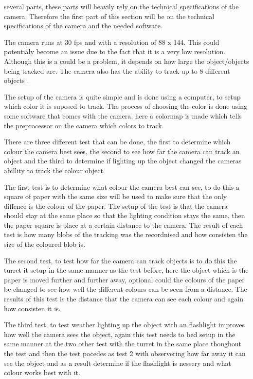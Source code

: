 several parts, these parts will heavily rely
on the technical specifications of the camera. Therefore the first part of this
section will be on the technical specifications of the camera and the needed
software.\nl

The camera runs at 30 fps and with a resolution of 88 x 144. This could
potentialy become an issue due to the fact that it is a very low resolution.
Although this is a could be a problem, it depends on how large the
object/objects being tracked are.
The camera also has the ability to track up to 8 different objects
. \nl

The setup of the camera is quite simple and is done using a computer, to setup
which color it is suposed to track. The process of choosing the color is done
using some software that comes with the camera, here a colormap is made which
tells the preprocessor on the camera which colors to track. 

There are three different test that can be done, the first to 
determine which colour the camera best sees, the second to see how
far the camera can track an object and the third to determine if lighting up the
object changed the cameras abillity to track the colour \/ object.\nl

The first test is to determine what colour the camera best can see, to do this
a square of paper with the same size will be used to make sure that the only
diffence is the colour of the paper. The setup of the test is that the camera
should stay at the same place so that the lighting condition stays the same,
then the paper square is place at a certain distance to the camera. The result
of each test is how many blobs of the tracking was the recordnised and how
consisten the size of the coloured blob is.\nl

The second test, to test how far the camera can track objects is to do this the
turret it setup in the same manner as the test before, here the object which is
the paper is moved further and further away, optional could the colours of the
paper be changed to see how well the different colours can be seen from a
distance. The results of this test is the distance that the camera can see each
colour and again how consisten it is.\nl

The third test, to test weather lighting up the object with an flashlight
improves how well the camera sees the object, again this test needs to bed setup
in the same manner at the two other test with the turret in the same place
thoughout the test and then the test pocedes as test 2 with observering how far
away it can see the object and as a result determine if the flashlight is
nessery and what colour works best with it.

